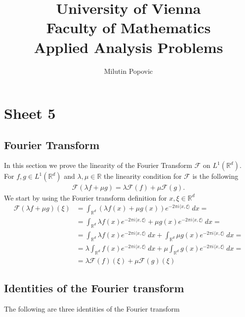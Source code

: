 \documentclass[a4paper]{article}
\title{University of Vienna\\ Faculty of Mathematics\\
\vspace{1cm}Applied Analysis Problems
}
\author{Milutin Popovic}
\begin{document}
\maketitle
\tableofcontents

\section{Sheet 5}
\subsection{Fourier Transform}
In this section we prove the linearity of the Fourier Transform $\mathcal{F}$ on
$L^1(\mathbb{R}^d)$. For $f, g \in L^1(\mathbb{R}^d)$ and $\lambda, \mu \in
\mathbb{R}$ the linearity condition for $\mathcal{F}$ is the following
\begin{align}
    \mathcal{F}(\lambda f + \mu g) = \lambda \mathcal{F}(f) + \mu
    \mathcal{F}(g).
\end{align}
We start by using the Fourier transform definition for $x, \xi \in \mathbb{R}^d$
\begin{align}
    \mathcal{F}(\lambda f + \mu g)(\xi) &= \int_{\mathbb{R}^d} (\lambda f(x)+
    \mu g(x)) e^{-2\pi i \langle x, \xi\rangle}\ dx =\\
    &= \int_{\mathbb{R}^d} \lambda f(x) e^{-2\pi i\langle x,\xi\rangle} + \mu
    g(x) e^{-2\pi i\langle x,\xi\rangle}\ dx =\\
    &= \int_{\mathbb{R}^d} \lambda f(x) e^{-2\pi i\langle x,\xi\rangle}\ dx+
    \int_{\mathbb{R}^d} \mu
    g(x) e^{-2\pi i\langle x,\xi\rangle}\ dx =\\
    &= \lambda \int_{\mathbb{R}^d} f(x) e^{-2\pi i\langle x,\xi\rangle}\ dx+
    \mu \int_{\mathbb{R}^d}
    g(x) e^{-2\pi i\langle x,\xi\rangle}\ dx =\\
    &= \lambda \mathcal{F}(f)(\xi) + \mu \mathcal{F}(g)(\xi)
\end{align}
\subsection{Identities of the Fourier transform}
The following are three identities of the Fourier transform
\end{document}
